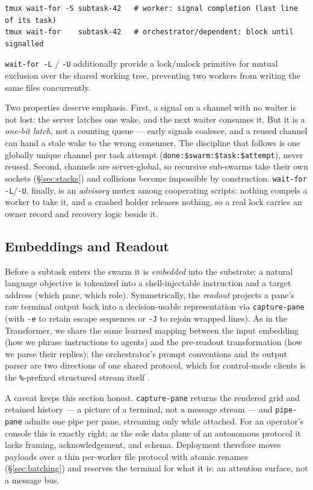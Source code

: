 \documentclass[10pt]{article}
\newcommand{\code}[1]{\texttt{\small #1}}
\begin{document}
\begin{lstlisting}
tmux wait-for -S subtask-42   # worker: signal completion (last line of its task)
tmux wait-for    subtask-42   # orchestrator/dependent: block until signalled
\end{lstlisting}

\code{wait-for -L} / \code{-U} additionally provide a lock/unlock primitive for mutual
exclusion over the shared working tree, preventing two workers from writing the same
files concurrently.

Two properties deserve emphasis. First, a signal on a channel with no waiter is not
lost: the server latches one wake, and the next waiter consumes it. But it is a
\emph{one-bit latch}, not a counting queue --- early signals coalesce, and a reused
channel can hand a stale wake to the wrong consumer. The discipline that follows is
one globally unique channel per task attempt
(\code{done:\$swarm:\$task:\$attempt}), never reused. Second, channels are
server-global, so recursive sub-swarms take their own sockets
(\S\ref{sec:stacks}) and collisions become impossible by construction.
\code{wait-for -L}/\code{-U}, finally, is an \emph{advisory} mutex among
cooperating scripts: nothing compels a worker to take it, and a crashed holder
releases nothing, so a real lock carries an owner record and recovery logic beside
it.

\subsection{Embeddings and Readout}

Before a subtask enters the swarm it is \emph{embedded} into the substrate: a natural
language objective is tokenized into a shell-injectable instruction and a target
address (which pane, which role). Symmetrically, the \emph{readout} projects a pane's
raw terminal output back into a decision-usable representation via \code{capture-pane}
(with \code{-e} to retain escape sequences or \code{-J} to rejoin wrapped lines). As
in the Transformer, we share the same learned mapping between the input embedding (how
we phrase instructions to agents) and the pre-readout transformation (how we parse
their replies): the orchestrator's prompt conventions and its output parser are two
directions of one shared protocol, which for control-mode clients is the
\code{\%}-prefixed structured stream itself \cite{tmuxcontrol}.

A caveat keeps this section honest. \code{capture-pane} returns the rendered grid
and retained history --- a picture of a terminal, not a message stream --- and
\code{pipe-pane} admits one pipe per pane, streaming only while attached. For an
operator's console this is exactly right; as the sole data plane of an autonomous
protocol it lacks framing, acknowledgement, and schema. Deployment therefore moves
payloads over a thin per-worker file protocol with atomic renames
(\S\ref{sec:batching}) and reserves the terminal for what it is: an attention
surface, not a message bus.
\end{document}
